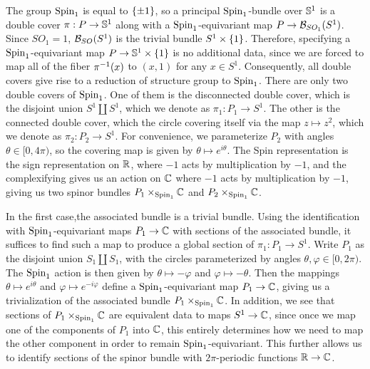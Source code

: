 \begin{exmp}
The group $\Spin_1$ is equal to $\set{\pm 1}$, so a principal $\Spin_1$-bundle
over $\S^1$ is a double cover $\pi : P \to \S^1$ along with a $\Spin_1$-equivariant
map $P \to \B_{SO_1}(S^1)$. Since $SO_1 = 1$, $\B_{SO}(S^1)$ is the trivial
bundle $S^1 \times \set{1}$. Therefore, specifying a $\Spin_1$-equivariant map
$P \to \S^1 \times \set{1}$ is no additional data, since we are forced to map
all of the fiber $\pi\inv(x)$ to $(x,1)$ for any $x \in S^1$. Consequently,
all double covers give rise to a reduction of structure group to $\Spin_1$.
There are only two double covers of $\Spin_1$. One of them is the disconnected
double cover, which is the disjoint union $S^1 \coprod S^1$, which we denote
as $\pi_1 : P_1 \to S^1$. The other is the connected double cover, which the
circle covering itself via the map $z \mapsto z^2$, which we denote as
$\pi_2 : P_2 \to S^1$. For convenience, we parameterize $P_2$ with angles
$\theta \in [0, 4\pi)$, so the covering map is given by $\theta \mapsto e^{i\theta}$.
The Spin representation is the sign representation on $\R$, where $-1$
acts by multiplication by $-1$, and the complexifying gives us an action on
$\C$ where $-1$ acts by multiplication by $-1$, giving us two spinor bundles
$P_1 \times_{\Spin_1} \C$ and $P_2 \times_{\Spin_1} \C$.

In the first case,the associated bundle is a trivial bundle. Using the identification
with $\Spin_1$-equivariant maps $P_1 \to \C$ with sections of the associated
bundle, it suffices to find such a map to produce a global section of
$\pi_1 : P_1 \to S^1$. Write $P_1$ as the disjoint union $S_1 \coprod S_1$,
with the circles parameterized by angles $\theta,\varphi \in [0,2\pi)$.
The $\Spin_1$ action is then given by $\theta \mapsto -\varphi$ and
$\varphi \mapsto -\theta$. Then the mappings $\theta \mapsto e^{i\theta}$
and $\varphi \mapsto e^{-i\varphi}$ define a $\Spin_1$-equivariant map
$P_1 \to \C$, giving us a trivialization of the associated bundle
$P_1 \times_{\Spin_1} \C$. In addition, we see that sections of $P_1\times_{\Spin_1}\C$
are equivalent data to maps $S^1 \to \C$, since once we map one of the components
of $P_1$ into $\C$, this entirely determines how we need to map the other component
in order to remain $\Spin_1$-equivariant. This further allows us to identify
sections of the spinor bundle with $2\pi$-periodic functions $\R \to \C$.


\end{exmp}
